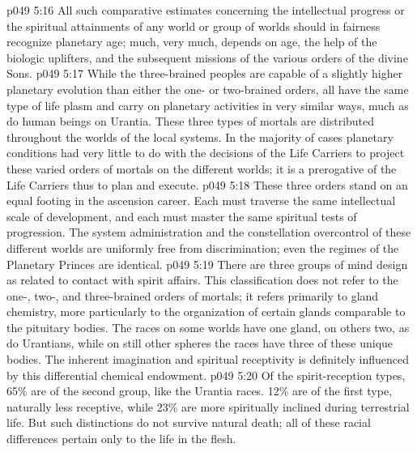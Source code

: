 \vs p049 5:16 All such comparative estimates concerning the intellectual progress or the spiritual attainments of any world or group of worlds should in fairness recognize planetary age; much, very much, depends on age, the help of the biologic uplifters, and the subsequent missions of the various orders of the divine Sons.
\vs p049 5:17 While the three\hyp{}brained peoples are capable of a slightly higher planetary evolution than either the one\hyp{} or two\hyp{}brained orders, all have the same type of life plasm and carry on planetary activities in very similar ways, much as do human beings on Urantia. These three types of mortals are distributed throughout the worlds of the local systems. In the majority of cases planetary conditions had very little to do with the decisions of the Life Carriers to project these varied orders of mortals on the different worlds; it is a prerogative of the Life Carriers thus to plan and execute.
\vs p049 5:18 These three orders stand on an equal footing in the ascension career. Each must traverse the same intellectual scale of development, and each must master the same spiritual tests of progression. The system administration and the constellation overcontrol of these different worlds are uniformly free from discrimination; even the regimes of the Planetary Princes are identical.
\vs p049 5:19 \bibnobreakspace {} There are three groups of mind design as related to contact with spirit affairs. This classification does not refer to the one-, two-, and three\hyp{}brained orders of mortals; it refers primarily to gland chemistry, more particularly to the organization of certain glands comparable to the pituitary bodies. The races on some worlds have one gland, on others two, as do Urantians, while on still other spheres the races have three of these unique bodies. The inherent imagination and spiritual receptivity is definitely influenced by this differential chemical endowment.
\vs p049 5:20 Of the spirit\hyp{}reception types, 65\% are of the second group, like the Urantia races. 12\% are of the first type, naturally less receptive, while 23\% are more spiritually inclined during terrestrial life. But such distinctions do not survive natural death; all of these racial differences pertain only to the life in the flesh.

